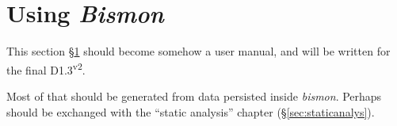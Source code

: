\section{Using \emph{Bismon}}
\label{sec:using}

This section §\ref{sec:using} should become somehow a user manual, and will be written for the final D1.3\textsuperscript{v2}.

Most of that should be generated from data persisted inside \emph{bismon}. Perhaps
should be exchanged with the ``static analysis'' chapter
(§\ref{sec:staticanalys}).


